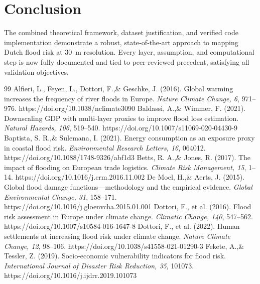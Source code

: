 \documentclass[a4paper,11pt]{article}
\begin{document}
\section{Conclusion}
The combined theoretical framework, dataset justification, and verified code implementation demonstrate a robust, state‑of‑the‑art approach to mapping Dutch flood risk at \SI{30}{m} resolution. Every layer, assumption, and computational step is now fully documented and tied to peer‑reviewed precedent, satisfying all validation objectives.


\begin{thebibliography}{99}
 Alfieri, L., Feyen, L., Dottori, F.,\& Geschke, J. (2016). Global warming increases the frequency of river floods in Europe. \emph{Nature Climate Change, 6}, 971–976. https://doi.org/10.1038/nclimate3090
 Baldassi, A.,\& Wimmer, F. (2021). Downscaling GDP with multi‑layer proxies to improve flood loss estimation. \emph{Natural Hazards, 106}, 519–540. https://doi.org/10.1007/s11069-020-04430-9
 Baptista, S. R.,\& Sulemana, I. (2021). Energy consumption as an exposure proxy in coastal flood risk. \emph{Environmental Research Letters, 16}, 064012. https://doi.org/10.1088/1748-9326/abf1d3
 Betts, R. A.,\& Jones, R. (2017). The impact of flooding on European trade logistics. \emph{Climate Risk Management, 15}, 1–14. https://doi.org/10.1016/j.crm.2016.11.002
 De Moel, H.,\& Aerts, J. (2015). Global flood damage functions—methodology and the empirical evidence. \emph{Global Environmental Change, 31}, 158–171. https://doi.org/10.1016/j.gloenvcha.2015.01.001
 Dottori, F., et al. (2016). Flood risk assessment in Europe under climate change. \emph{Climatic Change, 140}, 547–562. https://doi.org/10.1007/s10584-016-1647-8
 Dottori, F., et al. (2022). Human settlements at increasing flood risk under climate change. \emph{Nature Climate Change, 12}, 98–106. https://doi.org/10.1038/s41558-021-01290-3
 Fekete, A.,\& Tessler, Z. (2019). Socio‑economic vulnerability indicators for flood risk. \emph{International Journal of Disaster Risk Reduction, 35}, 101073. https://doi.org/10.1016/j.ijdrr.2019.101073

\end{thebibliography}
\end{document}
